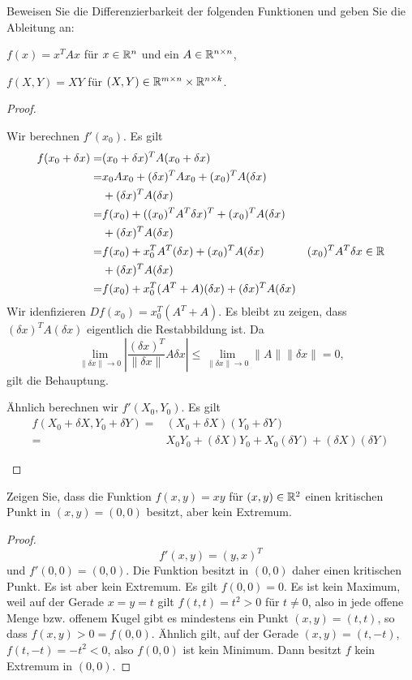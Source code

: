 \begin{Problem}
Beweisen Sie die Differenzierbarkeit der folgenden Funktionen und geben Sie die Ableitung an:	
\begin{parts}
\item $f(x)=x^TAx$ f\"{u}r $x\in \mathbb{R}^n$ und ein $A\in \mathbb{R}^{n\times n}$,
\item $f(X,Y)=XY$ f\"{u}r $(X,Y)\in \mathbb{R}^{m\times n}\times \mathbb{R}^{n\times k}$.
\end{parts}
\end{Problem}
\begin{proof}
	\begin{parts}
	\item Wir berechnen $f'(x_0)$. Es gilt
		\begin{align*}
			f(x_0+\delta x)=&(x_0+\delta x)^T A(x_0+\delta x)\\
			=&x_0Ax_0+(\delta x)^TAx_0+(x_0)^TA(\delta x)\\
			 &+(\delta x)^T A(\delta x)\\
			=&f(x_0)+((x_0)^TA^T\delta x)^T+(x_0)^TA(\delta x)\\
			 &+(\delta x)^T A(\delta x)\\
			=&f(x_0)+x_0^T A^T(\delta x)+(x_0)^TA(\delta x) & (x_0)^TA^T \delta x\in \mathbb{R}\\
			 &+(\delta x)^TA(\delta x)\\
			=&f(x_0)+x_0^T(A^T+A)(\delta x)+(\delta x)^T A(\delta x)
		\end{align*}
		Wir idenfizieren $Df(x_0)=x_0^T(A^T+A)$. Es bleibt zu zeigen, dass $(\delta x)^T A(\delta x)$ eigentlich die Restabbildung ist. Da
		\[
			\lim_{\|\delta x\| \to 0} \left|\frac{(\delta x)^T}{\|\delta x\|} A\delta x\right|\le\lim_{\|\delta x\| \to 0} \|A\| \|\delta x\|=0
		,\]
		gilt die Behauptung.
	\item Ähnlich berechnen wir $f'(X_0,Y_0)$. Es gilt
		\begin{align*}
			f(X_0+\delta X, Y_0+\delta Y)=&(X_0+\delta X)(Y_0+\delta Y)\\
			=&X_0Y_0+(\delta X)Y_0+X_0(\delta Y)+(\delta X)(\delta Y)
		\end{align*}
	\end{parts}
\end{proof}

\begin{Problem}
	Zeigen Sie, dass die Funktion $f(x,y)=xy$ f\"{u}r $(x,y)\in \mathbb{R}^2$ einen kritischen Punkt in $(x,y)=(0,0)$ besitzt, aber kein Extremum.
\end{Problem}
\begin{proof}
	\[
	f'(x,y)=(y,x)^T
\]
und $f'(0,0)=(0,0)$. Die Funktion besitzt in $(0,0)$ daher einen kritischen Punkt. Es ist aber kein Extremum. Es gilt $f(0,0)=0$. Es ist kein Maximum, weil auf der Gerade $x=y=t$ gilt $f(t,t)=t^2>0$ f\"{u}r $t\neq 0$, also in jede offene Menge bzw. offenem Kugel gibt es mindestens ein Punkt $(x,y)=(t,t)$, so dass $f(x,y)>0=f(0,0)$. Ähnlich gilt, auf der Gerade $(x,y)=(t,-t)$, $f(t,-t)=-t^2<0$, also $f(0,0)$ ist kein Minimum. Dann  besitzt $f$ kein Extremum in $(0,0)$.
\end{proof}
